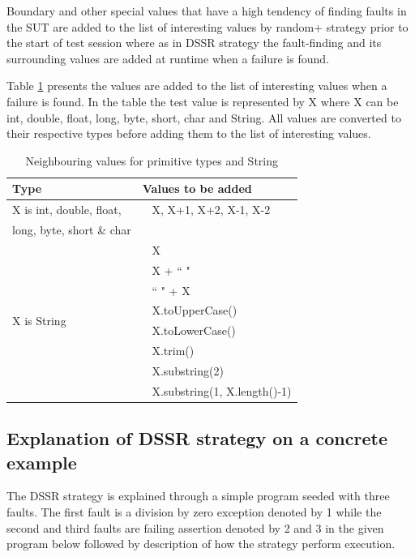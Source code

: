 \documentclass[conference]{IEEEtran}
\begin{document}
Boundary and other special values that have a high tendency of finding faults in the SUT are added to the list of interesting values by random+ strategy prior to the start of test session where as in DSSR strategy the fault-finding and its surrounding values are added at runtime when a failure is found. 

Table \ref{table:addvalues} presents the values are added to the list of interesting values when a failure is found. In the table the test value is represented by X where X can be int, double, float, long, byte, short, char and String. All values are converted to their respective types before adding them to the list of interesting values.

\begin{table}[ht]
\caption{Neighbouring values for primitive types and String} %
\centering %
\begin{tabular}{| l | l |} %
\hline\hline %
Type & Values to be added\\ [0.5ex] %
\hline %
\multirow{1}{*}{X is int, double, float, } & ~ X,  X+1, X+2, X-1, X-2 \\ %
\multirow{1}{*}{long, byte, short \& char} &  \\ 

\hline
\multirow{8}{*}{X is String} & ~ X\\ %

& ~ X + ``  "\\ %
& ~ ``  " + X \\ %
& ~ X.toUpperCase() \\
& ~ X.toLowerCase() \\
& ~ X.trim() \\
& ~ X.substring(2) \\
& ~ X.substring(1, X.length()-1) \\[1ex]
\hline
\hline %
\end{tabular}
\bigskip
\label{table:addvalues} %
\end{table}







\subsection{Explanation of DSSR strategy on a concrete example}
The DSSR strategy is explained through a simple program seeded with three faults. The first fault is a division by zero exception denoted by 1 while the second and third faults are failing assertion denoted by 2 and 3 in the given program below followed by description of how the strategy perform execution.
\end{document}

